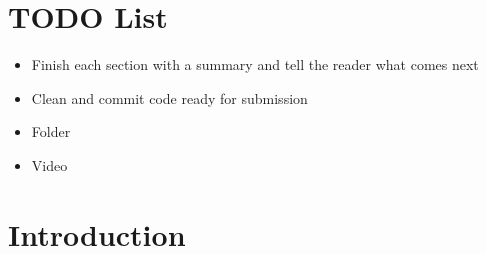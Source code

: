 \documentclass[a4paper]{article}
\begin{document}
\vfill
\section*{TODO List}
\begin{itemize}
    \item Finish each section with a summary and tell the reader what comes next
	\item Clean and commit code ready for submission
	\item Folder
	\item Video
\end{itemize}

\pagebreak

\tableofcontents
\pagebreak
\setcounter{page}{1}

\section{Introduction}
\end{document}

